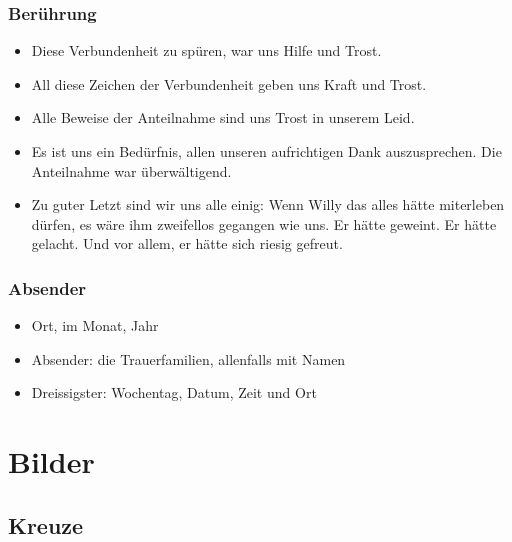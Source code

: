 \documentclass[ngerman,a4paper,11pt]{scrreprt}
\begin{document}
\section{Berührung}
\label{sec-2-1-9}

\begin{itemize}
\item Diese Verbundenheit zu spüren, war uns Hilfe und Trost.
\item All diese Zeichen der Verbundenheit geben uns Kraft und Trost.
\item Alle Beweise der Anteilnahme sind uns Trost in unserem Leid.
\item Es ist uns ein Bedürfnis, allen unseren aufrichtigen Dank
auszusprechen. Die Anteilnahme war überwältigend.
\item Zu guter Letzt sind wir uns alle einig: Wenn Willy das alles hätte
miterleben dürfen, es wäre ihm zweifellos gegangen wie uns. Er hätte
geweint. Er hätte gelacht. Und vor allem, er hätte sich riesig gefreut.
\end{itemize}

\section{Absender}
\label{sec-2-1-10}

\begin{itemize}
\item Ort, im Monat, Jahr
\item Absender: die Trauerfamilien, allenfalls mit Namen
\item Dreissigster: Wochentag, Datum, Zeit und Ort
\end{itemize}

\part{Bilder}
\label{sec-3}

\chapter{Kreuze}
\label{sec-3-1}
\end{document}
